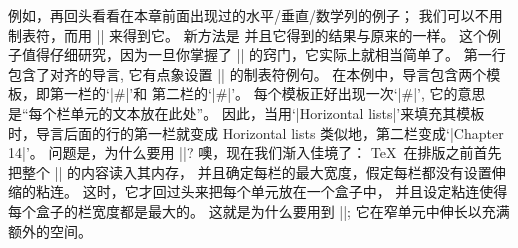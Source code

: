 \danger 例如，再回头看看在本章前面出现过的水平/垂直/数学列的例子；
我们可以不用制表符，而用 |\halign| 来得到它。%
新方法是
\begintt
{}
\endtt
并且它得到的结果与原来的一样。%
这个例子值得仔细研究，因为一旦你掌握了 |\halign| 的窍门，它实际上就相当简单了。%
第一行包含了对齐的{导言}, 它有点象设置 |\+| 的制表符例句。%
在本例中，导言包含两个模板，即第一栏的`|\indent#\hfil|'和%
第二栏的`|\quad#\hfil|'。%
每个模板正好出现一次`|#|',
它的意思是``每个栏单元的文本放在此处''。%
因此，当用`|Horizontal lists|'来填充其模板时，导言后面的行的第一栏就变成
\begintt
\indent Horizontal lists\hfil
\endtt
类似地，第二栏变成`|\quad Chapter 14\hfil|'。%
问题是，为什么要用 |\hfil|?
噢，现在我们渐入佳境了：
 \TeX\ 在排版之前首先把整个 || 的内容读入其内存，
并且确定每栏的最大宽度，假定每栏都没有设置伸缩的粘连。%
这时，它才回过头来把每个单元放在一个盒子中，
并且设定粘连使得每个盒子的栏宽度都是最大的。%
这就是为什么要用到 |\hfil|;
它在窄单元中伸长以充满额外的空间。

